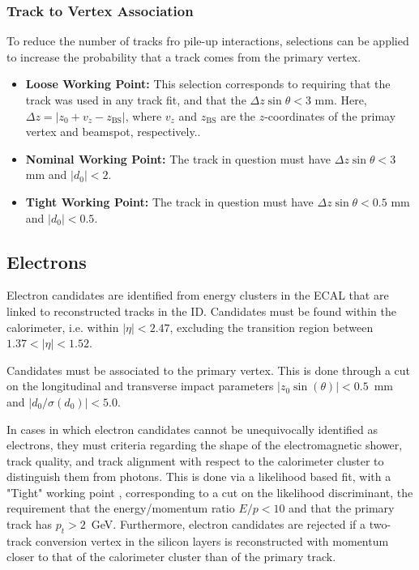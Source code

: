 \documentclass[10pt,a4paper]{book}
\begin{document}
\subsubsection{Track to Vertex Association}
To reduce the number of tracks fro pile-up interactions, selections can be applied to increase the probability that a track comes from the primary vertex.
\begin{itemize}
    \item \textbf{Loose Working Point:} This selection corresponds to requiring that the track was used in any track fit, and that the $ \Delta z \sin\theta < 3$ mm. Here, $\Delta z = \vert z_0 + v_z - z_{\text{BS}}\vert$, where $v_z$ and $z_{\text{BS}}$ are the $z$-coordinates of the primay vertex and beamspot, respectively..
    \item \textbf{Nominal Working Point:} The track in question must have $ \Delta z \sin\theta < 3$ mm and $\vert d_0\vert < 2$.
    \item \textbf{Tight Working Point:} The track in question must have $ \Delta z \sin\theta < 0.5$ mm and $\vert d_0\vert < 0.5$.
\end{itemize}

\subsection{Electrons}
Electron candidates are identified from energy clusters in the ECAL that are linked to reconstructed tracks in the ID. Candidates must be found within the calorimeter, i.e. within $\vert \eta \vert < 2.47$, excluding the transition region between $1.37 < \vert \eta \vert < 1.52$. 

Candidates must be associated to the primary vertex. This is done through a cut on the longitudinal and transverse impact parameters $\vert z_0\sin(\theta)\vert  < 0.5$~mm and $\vert d_0/\sigma(d_0)\vert < 5.0$.  

In cases in which electron candidates cannot be unequivocally identified as electrons, they must criteria regarding the shape of the electromagnetic shower, track quality, and track alignment with respect to the calorimeter cluster to distinguish them from photons. This is done via a likelihood based fit, with a "Tight" working point \cite{ATLAS:2019qmc}, corresponding to a cut on the likelihood discriminant, the requirement that the energy/momentum ratio $E/p < 10$ and that the primary track has $p_t > 2$~GeV. Furthermore, electron candidates are rejected if a two-track conversion vertex in the silicon layers is reconstructed with momentum closer to that of the calorimeter cluster than of the primary track. 
\end{document}
